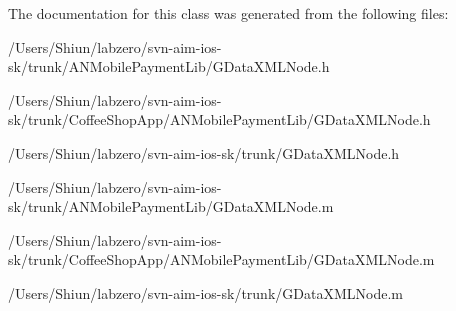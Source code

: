 The documentation for this class was generated from the following files:\begin{DoxyCompactItemize}
\item 
/Users/Shiun/labzero/svn-\/aim-\/ios-\/sk/trunk/ANMobilePaymentLib/GDataXMLNode.h\item 
/Users/Shiun/labzero/svn-\/aim-\/ios-\/sk/trunk/CoffeeShopApp/ANMobilePaymentLib/GDataXMLNode.h\item 
/Users/Shiun/labzero/svn-\/aim-\/ios-\/sk/trunk/GDataXMLNode.h\item 
/Users/Shiun/labzero/svn-\/aim-\/ios-\/sk/trunk/ANMobilePaymentLib/GDataXMLNode.m\item 
/Users/Shiun/labzero/svn-\/aim-\/ios-\/sk/trunk/CoffeeShopApp/ANMobilePaymentLib/GDataXMLNode.m\item 
/Users/Shiun/labzero/svn-\/aim-\/ios-\/sk/trunk/GDataXMLNode.m\end{DoxyCompactItemize}
